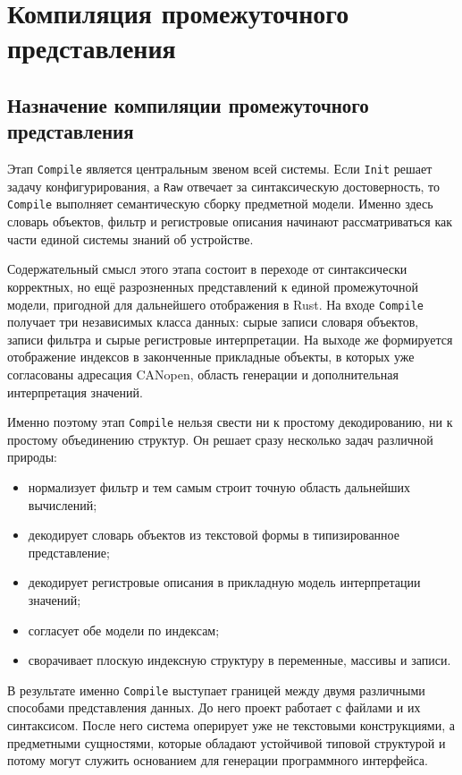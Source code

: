 \documentclass[a4paper,12pt]{article}
\begin{document}
\pagebreak

\section{Компиляция промежуточного представления}

\subsection{Назначение компиляции промежуточного представления}

Этап \texttt{Compile} является центральным звеном всей системы. Если \texttt{Init}
решает задачу конфигурирования, а \texttt{Raw} отвечает за синтаксическую достоверность,
то \texttt{Compile} выполняет семантическую сборку предметной модели. Именно здесь
словарь объектов, фильтр и регистровые описания начинают рассматриваться как части
единой системы знаний об устройстве.

Содержательный смысл этого этапа состоит в переходе от синтаксически корректных, но
ещё разрозненных представлений к единой промежуточной модели, пригодной для дальнейшего
отображения в Rust. На входе \texttt{Compile} получает три независимых класса данных:
сырые записи словаря объектов, записи фильтра и сырые регистровые интерпретации. На
выходе же формируется отображение индексов в законченные прикладные объекты, в которых
уже согласованы адресация CANopen, область генерации и дополнительная интерпретация
значений.

Именно поэтому этап \texttt{Compile} нельзя свести ни к простому декодированию, ни к
простому объединению структур. Он решает сразу несколько задач различной природы:
\begin{itemize}
  \item нормализует фильтр и тем самым строит точную область дальнейших вычислений;
  \item декодирует словарь объектов из текстовой формы в типизированное представление;
  \item декодирует регистровые описания в прикладную модель интерпретации значений;
  \item согласует обе модели по индексам;
  \item сворачивает плоскую индексную структуру в переменные, массивы и записи.
\end{itemize}

В результате именно \texttt{Compile} выступает границей между двумя различными
способами представления данных. До него проект работает с файлами и их синтаксисом.
После него система оперирует уже не текстовыми конструкциями, а предметными сущностями,
которые обладают устойчивой типовой структурой и потому могут служить основанием для
генерации программного интерфейса.
\end{document}
